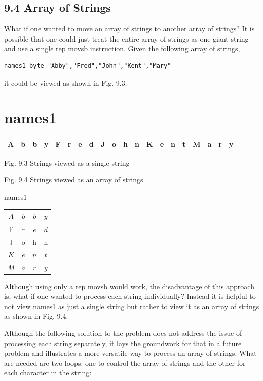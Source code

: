 \documentclass[10pt]{book}
\begin{document}
\begin{center}
\begin{center}
\begin{center}
\begin{center}
\subsection*{9.4 Array of Strings}
What if one wanted to move an array of strings to another array of strings? It is possible that one could just treat the entire array of strings as one giant string and use a single rep movsb instruction. Given the following array of strings,

\begin{verbatim}
names1 byte "Abby","Fred","John","Kent","Mary"
\end{verbatim}

it could be viewed as shown in Fig. 9.3.

\section*{names1}
\begin{center}
\begin{tabular}{|l|l|l|l|l|l|l|l|l|l|l|l|l|l|l|l|l|l|l|l|}
\hline
A & b & b & y & F & r & e & d & J & o & h & n & K & e & n & t & M & a & r & y \\
\hline
\end{tabular}
\end{center}

Fig. 9.3 Strings viewed as a single string


Fig. 9.4 Strings viewed as an array of strings

names1 \begin{tabular}{|c|c|c|c|}
\hline
$A$ & $b$ & $b$ & $y$ \\
\hline
F & r & $e$ & $d$ \\
\hline
J & o & h & n \\
\hline
$K$ & $e$ & $n$ & $t$ \\
\hline
$M$ & $a$ & $r$ & $y$ \\
\hline
\end{tabular}

Although using only a rep movsb would work, the disadvantage of this approach is, what if one wanted to process each string individually? Instead it is helpful to not view names1 as just a single string but rather to view it as an array of strings as shown in Fig. 9.4.

Although the following solution to the problem does not address the issue of processing each string separately, it lays the groundwork for that in a future problem and illustrates a more versatile way to process an array of strings. What are needed are two loops: one to control the array of strings and the other for each character in the string:


\end{center}
\end{center}
\end{center}
\end{center}
\end{document}
